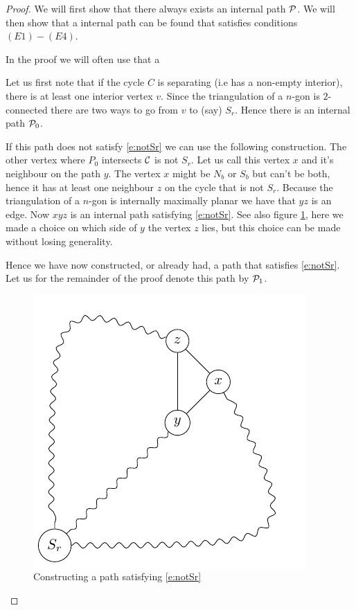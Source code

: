 \begin{proof}
We will first show that there always exists an internal path $\P$. We will then show that a internal path can be found that satisfies conditions $(E1) - (E4)$.

In the proof we will often use that a 

Let us first note that if the cycle $C$ is separating (i.e has a non-empty interior), there is at least one interior vertex $v$. Since the triangulation of a $n$-gon is $2$-connected there are two ways to go from $v$ to (say) $S_r$. Hence there is an internal path $\P_0$.

If this path does not satisfy \ref{e:notSr} we can use the following construction. The other vertex where $P_0$ intersects $\C$ is not $S_r$. Let us call this vertex $x$ and it's neighbour on the path $y$. The vertex $x$ might be $N_b$ or $S_b$ but can't be both, hence it has at least one neighbour $z$ on the cycle that is not $S_r$. Because the triangulation of a $n$-gon is internally maximally planar we have that $yz$ is an edge. Now $xyz$ is an internal path satisfying \ref{e:notSr}. See also figure \ref{fig:E1}, here we made a choice on which side of $y$ the vertex $z$ lies, but this choice can be made without losing generality.

Hence we have now constructed, or already had, a path that satisfies \ref{e:notSr}. Let us for the remainder of the proof denote this path by $\P_1$.


\begin{figure}[ht]
\centering
\includegraphics[]{img/E1}
\caption{Constructing a path satisfying \ref{e:notSr} \label{fig:E1}}
\end{figure}


\end{proof}

